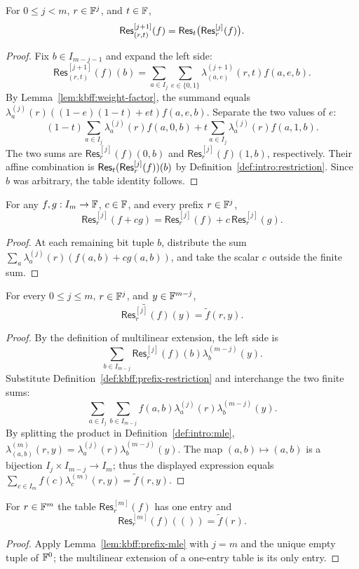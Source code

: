 \begin{lemma}\label{lem:kbff:prefix-step}
For $0\leq j<m$, $r\in\mathbb{F}^j$, and $t\in\mathbb{F}$,
\[
 \mathsf{Res}^{[j+1]}_{(r,t)}(f)
 =\mathsf{Res}_t\bigl(\mathsf{Res}^{[j]}_r(f)\bigr).
\]
\end{lemma}
\begin{proof}
Fix $b\in I_{m-j-1}$ and expand the left side:
\[
 \mathsf{Res}^{[j+1]}_{(r,t)}(f)(b)
 =\sum_{a\in I_j}\sum_{e\in\{0,1\}}
   \lambda^{(j+1)}_{(a,e)}(r,t) f(a,e,b).
\]
By Lemma~\ref{lem:kbff:weight-factor}, the summand equals
$\lambda^{(j)}_a(r)((1-e)(1-t)+et)f(a,e,b)$.
Separate the two values of $e$:
\[
 (1-t)\sum_{a\in I_j}\lambda^{(j)}_a(r)f(a,0,b)
 +t\sum_{a\in I_j}\lambda^{(j)}_a(r)f(a,1,b).
\]
The two sums are $\mathsf{Res}^{[j]}_r(f)(0,b)$ and
$\mathsf{Res}^{[j]}_r(f)(1,b)$, respectively. Their affine combination is
$\mathsf{Res}_t(\mathsf{Res}^{[j]}_r(f))(b)$ by Definition~\ref{def:intro:restriction}.
Since $b$ was arbitrary, the table identity follows.
\end{proof}

\begin{lemma}\label{lem:kbff:prefix-linear}
For any $f,g:I_m\to\mathbb{F}$, $c\in\mathbb{F}$, and every prefix $r\in\mathbb{F}^j$,
\[
 \mathsf{Res}^{[j]}_r(f+cg)=
 \mathsf{Res}^{[j]}_r(f)+c\,\mathsf{Res}^{[j]}_r(g).
\]
\end{lemma}
\begin{proof}
At each remaining bit tuple $b$, distribute the sum
$\sum_a\lambda^{(j)}_a(r)(f(a,b)+cg(a,b))$, and take the scalar $c$ outside the finite sum.
\end{proof}

\begin{lemma}\label{lem:kbff:prefix-mle}
For every $0\leq j\leq m$, $r\in\mathbb{F}^j$, and $y\in\mathbb{F}^{m-j}$,
\[
 \widetilde{\mathsf{Res}^{[j]}_r(f)}(y)=\widetilde f(r,y).
\]
\end{lemma}
\begin{proof}
By the definition of multilinear extension, the left side is
\[
 \sum_{b\in I_{m-j}}
     \mathsf{Res}^{[j]}_r(f)(b)\lambda^{(m-j)}_b(y).
\]
Substitute Definition~\ref{def:kbff:prefix-restriction} and interchange the two finite sums:
\[
 \sum_{a\in I_j}\sum_{b\in I_{m-j}}
 f(a,b)\lambda^{(j)}_a(r)\lambda^{(m-j)}_b(y).
\]
By splitting the product in Definition~\ref{def:intro:mle},
$\lambda^{(m)}_{(a,b)}(r,y)=
\lambda^{(j)}_a(r)\lambda^{(m-j)}_b(y)$.
The map $(a,b)\mapsto(a,b)$ is a bijection
$I_j\times I_{m-j}\to I_m$; thus the displayed expression equals
$\sum_{c\in I_m}f(c)\lambda^{(m)}_c(r,y)=\widetilde f(r,y)$.
\end{proof}

\begin{corollary}\label{cor:kbff:full-prefix}
For $r\in\mathbb{F}^m$ the table $\mathsf{Res}^{[m]}_r(f)$ has one entry and
\[
 \mathsf{Res}^{[m]}_r(f)(())=\widetilde f(r).
\]
\end{corollary}
\begin{proof}
Apply Lemma~\ref{lem:kbff:prefix-mle} with $j=m$ and the unique empty tuple of $\mathbb{F}^0$; the multilinear extension of a one-entry table is its only entry.
\end{proof}
